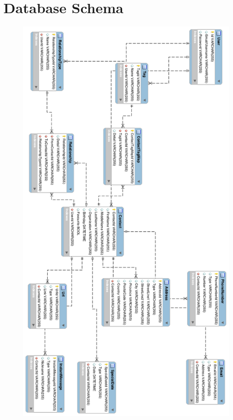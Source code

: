 \documentclass{uofsthesis-cs}
\begin{document}
\chapter{Database Schema}

\begin{figure}[!h]
\begin{center}
\includegraphics[scale=0.5]{pics/full_schema.png}
\end{center}
\end{figure}
\end{document}
